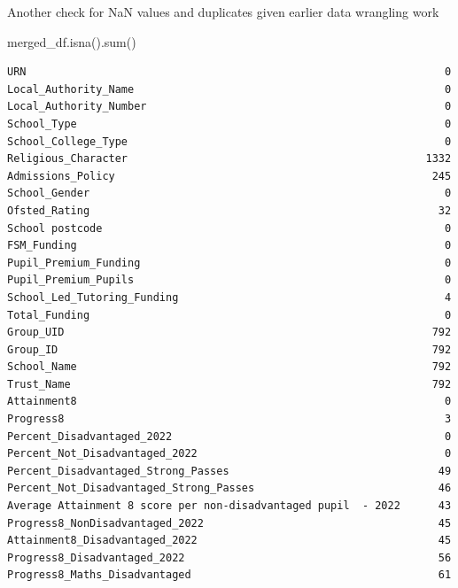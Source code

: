 \documentclass[
  letterpaper,
  DIV=11,
  numbers=noendperiod]{scrartcl}
\newenvironment{Shaded}{\begin{snugshade}}{\end{snugshade}}
\newcommand{\BuiltInTok}[1]{\textcolor[rgb]{0.00,0.23,0.31}{#1}}
\newcommand{\NormalTok}[1]{\textcolor[rgb]{0.00,0.23,0.31}{#1}}
\begin{document}
Another check for NaN values and duplicates given earlier data wrangling
work

\begin{Shaded}
\begin{Highlighting}[]
\NormalTok{merged\_df.isna().}\BuiltInTok{sum}\NormalTok{()}
\end{Highlighting}
\end{Shaded}

\begin{verbatim}
URN                                                                  0
Local_Authority_Name                                                 0
Local_Authority_Number                                               0
School_Type                                                          0
School_College_Type                                                  0
Religious_Character                                               1332
Admissions_Policy                                                  245
School_Gender                                                        0
Ofsted_Rating                                                       32
School postcode                                                      0
FSM_Funding                                                          0
Pupil_Premium_Funding                                                0
Pupil_Premium_Pupils                                                 0
School_Led_Tutoring_Funding                                          4
Total_Funding                                                        0
Group_UID                                                          792
Group_ID                                                           792
School_Name                                                        792
Trust_Name                                                         792
Attainment8                                                          0
Progress8                                                            3
Percent_Disadvantaged_2022                                           0
Percent_Not_Disadvantaged_2022                                       0
Percent_Disadvantaged_Strong_Passes                                 49
Percent_Not_Disadvantaged_Strong_Passes                             46
Average Attainment 8 score per non-disadvantaged pupil  - 2022      43
Progress8_NonDisadvantaged_2022                                     45
Attainment8_Disadvantaged_2022                                      45
Progress8_Disadvantaged_2022                                        56
Progress8_Maths_Disadvantaged                                       61

\end{verbatim}
\end{document}

